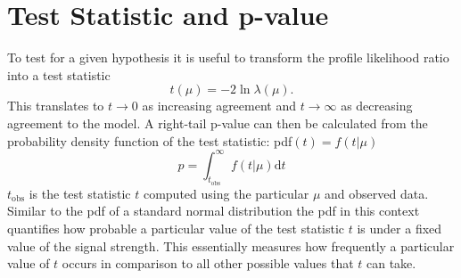 \section{Test Statistic and p-value}
To test for a given hypothesis it is useful to transform the profile likelihood ratio into a test statistic
\begin{equation}
    t(\mu)=-2\ln \lambda(\mu).
\end{equation}
This translates to $t \rightarrow 0$ as increasing agreement and $t \rightarrow \infty$ as decreasing agreement to the model. A right-tail p-value can then be calculated from the probability density function of the test statistic: \ac{pdf}$(t) = f(t | \mu)$
\begin{equation}\label{eq:p-value}
    p= \int_{t_\text{obs}}^{\infty}
    f(t | \mu) \mathrm{d}t
\end{equation}
$t_\text{obs}$ is the test statistic $t$ computed using the particular $\mu$ and observed data. Similar to the \ac{pdf} of a standard normal distribution the \ac{pdf} in this context quantifies how probable a particular value of the test statistic $t$ is under a fixed value of the signal strength. This essentially measures how frequently a particular value of $t$ occurs in comparison to all other possible values that $t$ can take.

